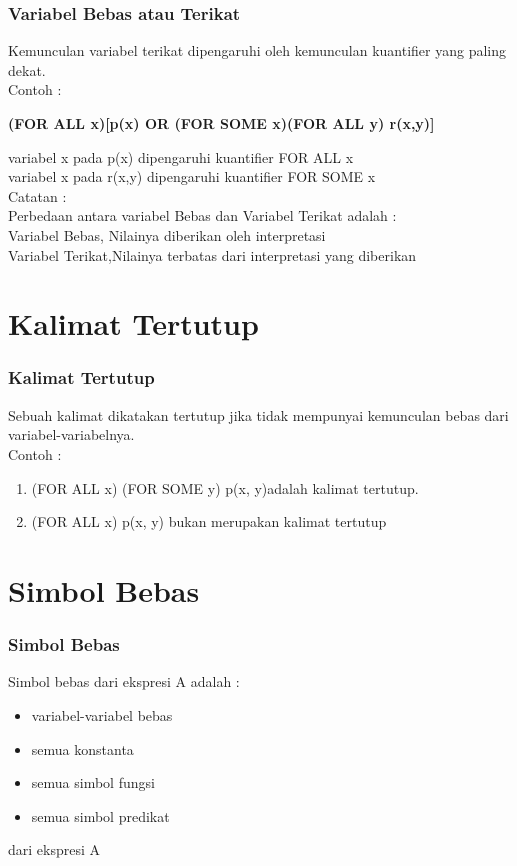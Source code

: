 \documentclass[handout]{beamer}
\theoremstyle{definition}
\theoremstyle{example}
\begin{document}
\begin{frame}
	\frametitle{Variabel Bebas atau Terikat}
	Kemunculan variabel terikat dipengaruhi oleh kemunculan kuantifier yang paling dekat.\\
	Contoh :\\
	\begin{center}
		\textbf{(FOR ALL x)[p(x) OR (FOR SOME x)(FOR ALL y) r(x,y)]}
	\end{center}
	 variabel x pada p(x) dipengaruhi kuantifier FOR ALL x\\
	 variabel x pada r(x,y) dipengaruhi kuantifier FOR SOME x\\
	 Catatan :\\
	 Perbedaan antara variabel Bebas dan Variabel Terikat adalah :\\
	 Variabel Bebas, Nilainya diberikan oleh interpretasi\\
	 Variabel Terikat,Nilainya terbatas dari interpretasi yang diberikan
	
\end{frame}	

\section{Kalimat Tertutup}
\begin{frame}
	\frametitle{Kalimat Tertutup}
	Sebuah kalimat dikatakan tertutup jika tidak mempunyai kemunculan bebas dari variabel-variabelnya.\\
	Contoh :\\
	\begin{enumerate}
		\item  (FOR ALL x) (FOR SOME y) p(x, y)adalah kalimat tertutup.
		\item (FOR ALL x) p(x, y) bukan merupakan kalimat tertutup
	\end{enumerate}		
\end{frame}	

\section{Simbol Bebas}
\begin{frame}
	\frametitle{Simbol Bebas}
	Simbol bebas dari ekspresi A adalah :\\
	\begin{itemize}
		\item variabel-variabel bebas
		\item semua konstanta
		\item semua simbol fungsi
		\item semua simbol predikat		
	\end{itemize}
	dari ekspresi A

\end{frame}
\end{document}
